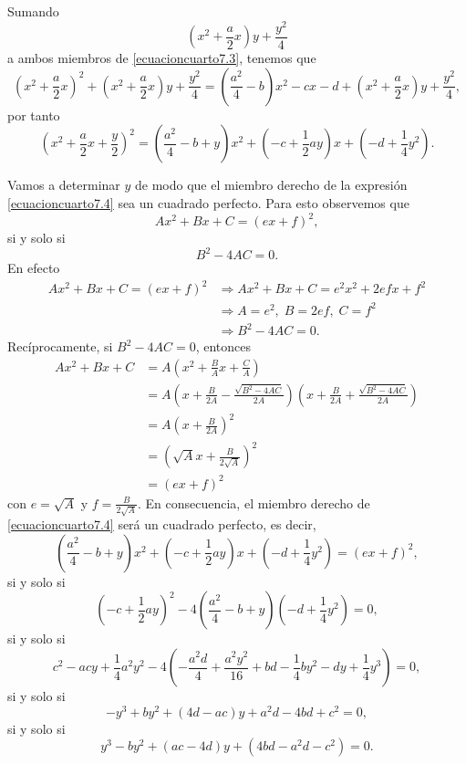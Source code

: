 Sumando
$$\left( x^2+\frac{a}{2}x \right) y + \frac{y^2}{4}$$
a ambos miembros de \eqref{ecuacioncuarto7.3}, tenemos que
$$\left( x^2+\frac{a}{2}x \right)^2 + \left( x^2+\frac{a}{2}x \right) y + \frac{y^2}{4} = \left( \frac{a^2}{4}-b \right) x^2-cx-d + \left( x^2+\frac{a}{2}x \right) y + \frac{y^2}{4},$$
por tanto
\begin{equation}
    \left( x^2+\frac{a}{2}x+\frac{y}{2} \right)^2 = \left( \frac{a^2}{4}-b+y \right) x^2 + \left( -c+\frac{1}{2} ay \right) x+ \left( -d + \frac{1}{4} y^2 \right). \label{ecuacioncuarto7.4}
\end{equation}

Vamos a determinar $y$ de modo que el miembro derecho de la expresión \eqref{ecuacioncuarto7.4} sea un cuadrado perfecto. Para esto observemos que
$$Ax^2+Bx+C=(ex+f)^2,$$
si y solo si
$$B^2-4AC=0.$$
En efecto
\begin{align*}
    Ax^2+Bx+C=(ex+f)^2 & \Longrightarrow Ax^2+Bx+C=e^2x^2+2efx+f^2 \\ 
    & \Longrightarrow A=e^2, \; B=2ef, \; C=f^2 \\ 
    & \Longrightarrow B^2-4AC=0.
\end{align*}
Recíprocamente, si $B^2-4AC=0$, entonces
\begin{align*}
    Ax^2+Bx+C &=A \left( x^2+\frac{B}{A}x+\frac{C}{A} \right) \\
    &=A \left( x+\frac{B}{2A}-\frac{\sqrt{B^2-4AC}}{2A} \right) \left( x+\frac{B}{2A}+\frac{\sqrt{B^2-4AC}}{2A} \right) \\
    &=A \left( x+\frac{B}{2A} \right)^2 \\
    &=\left( \sqrt{A}x+\frac{B}{2\sqrt{A}} \right)^2 \\
    &=(ex+f)^2
\end{align*}
con $e=\sqrt{A}$ y $\displaystyle f=\frac{B}{2\sqrt{A}}$. En consecuencia, el miembro derecho de \eqref{ecuacioncuarto7.4} será un cuadrado perfecto, es decir,
$$\left( \frac{a^2}{4}-b+y \right) x^2+\left( -c+\frac{1}{2}ay \right) x + \left( -d+\frac{1}{4}y^2 \right) = (ex+f)^2,$$
si y solo si
$$\left( -c+\frac{1}{2}ay \right)^2 -4 \left( \frac{a^2}{4}-b+y \right) \left( -d+\frac{1}{4}y^2 \right) =0,$$
si y solo si
$$c^2-acy+\frac{1}{4}a^2y^2-4 \left( -\frac{a^2d}{4}+\frac{a^2y^2}{16}+bd-\frac{1}{4}by^2-dy+\frac{1}{4} y^3 \right) =0,$$
si y solo si
$$-y^3+by^2+(4d-ac)y+a^2d-4bd+c^2=0,$$
si y solo si
\begin{equation}
    y^3-by^2+(ac-4d)y+\left(4bd-a^2d-c^2\right)=0. \label{ecuacioncuarto7.5}
\end{equation}

